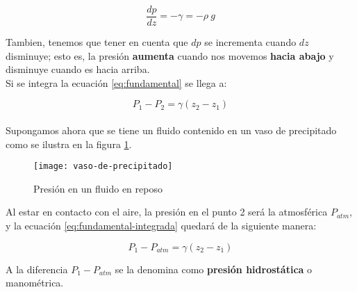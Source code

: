 \begin{equation}
	\dfrac{dp}{dz}= - \gamma = - \rho\ g
	\label{eq:fundamental}
\end{equation}

Tambien, tenemos que tener en cuenta que $dp$ se incrementa cuando $dz$ disminuye; esto es, la presión \textbf{aumenta} cuando nos movemos \textbf{hacia abajo} y disminuye cuando es hacia arriba.\\

Si se integra la ecuación \ref{eq:fundamental} se llega a:

\begin{equation}
	P_1 - P_2 = \gamma (z_2 - z_1)
	\label{eq:fundamental-integrada}
\end{equation}\\


Supongamos ahora que se tiene un fluido contenido en un vaso de precipitado como se ilustra en la figura \ref{fig:precipitado}. 

\begin{figure}[H]
	\centering
	\texttt{[image: vaso-de-precipitado]}
	\label{fig:precipitado}
	\caption{Presión en un fluido en reposo}
\end{figure}

Al estar en contacto con el aire, la presión en el punto 2 será la atmosférica $P_{atm}$, y la ecuación \ref{eq:fundamental-integrada} quedará de la siguiente manera:




\begin{equation}
	P_1 - P_{atm} = \gamma (z_2 - z_1)
\end{equation}


A la diferencia $P_1 - P_{atm}$ se la denomina como \textbf{presión hidrostática} o manométrica.\\



